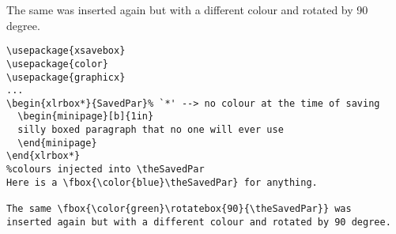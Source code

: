 \documentclass[a4paper]{article}
\begin{document}
The same  was inserted again but with a different colour and rotated by 90 degree.

\begin{Verbatim}
\usepackage{xsavebox}  
\usepackage{color}
\usepackage{graphicx}
...
\begin{xlrbox*}{SavedPar}% `*' --> no colour at the time of saving
  \begin{minipage}[b]{1in}
  silly boxed paragraph that no one will ever use
  \end{minipage}
\end{xlrbox*}
%colours injected into \theSavedPar
Here is a \fbox{\color{blue}\theSavedPar} for anything.

The same \fbox{\color{green}\rotatebox{90}{\theSavedPar}} was
inserted again but with a different colour and rotated by 90 degree.
\end{Verbatim}
\end{document}
